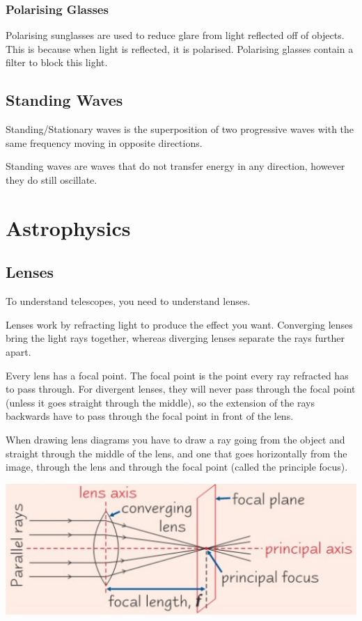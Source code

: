 \documentclass[a4paper, 12pt]{article}
\begin{document}
\subsubsection{Polarising Glasses}

Polarising sunglasses are used to reduce glare from light reflected off of objects. This is because when light is reflected, it is polarised. Polarising glasses contain a filter to block this light.

\subsection{Standing Waves}

Standing/Stationary waves is the superposition of two progressive waves with the same frequency moving in opposite directions.

Standing waves are waves that do not transfer energy in any direction, however they do still oscillate.

\newpage
\section{Astrophysics}

\subsection{Lenses}

To understand telescopes, you need to understand lenses.

Lenses work by refracting light to produce the effect you want. Converging lenses bring the light rays together, whereas diverging lenses separate the rays further apart.

Every lens has a focal point. The focal point is the point every ray refracted has to pass through. For divergent lenses, they will never pass through the focal point (unless it goes straight through the middle), so the extension of the rays backwards have to pass through the focal point in front of the lens.

When drawing lens diagrams you have to draw a ray going from the object and straight through the middle of the lens, and one that goes horizontally from the image, through the lens and through the focal point (called the principle focus).

\includegraphics[width=\textwidth]{images/lensDiagram.png}
\end{document}
